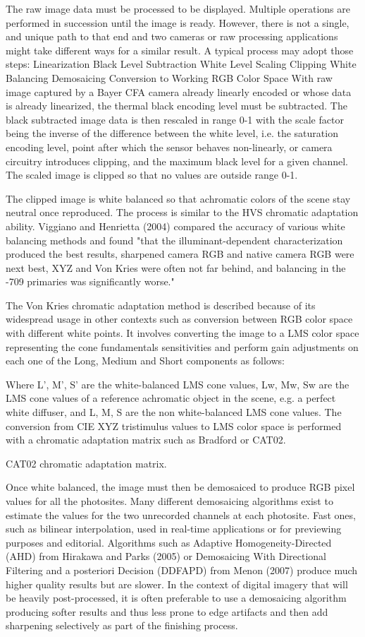 The raw image data must be processed to be displayed. Multiple operations are performed in succession until the image is ready. However, there is not a single, and unique path to that end and two cameras or raw processing applications might take different ways for a similar result. A typical process may adopt those steps:
Linearization
Black Level Subtraction
White Level Scaling
Clipping
White Balancing
Demosaicing
Conversion to Working RGB Color Space
With raw image captured by a Bayer CFA camera already linearly encoded or whose data is already linearized, the thermal black encoding level must be subtracted. The black subtracted image data is then rescaled in range 0-1 with the scale factor being the inverse of the difference between the white level, i.e. the saturation encoding level, point after which the sensor behaves non-linearly, or camera circuitry introduces clipping, and the maximum black level for a given channel. The scaled image is clipped so that no values are outside range 0-1.

The clipped image is white balanced so that achromatic colors of the scene stay neutral once reproduced. The process is similar to the HVS chromatic adaptation ability. Viggiano and Henrietta (2004) compared the accuracy of various white balancing methods and found "that the illuminant-dependent characterization produced the best results, sharpened camera RGB and native camera RGB were next best, XYZ and Von Kries were often not far behind, and balancing in the -709 primaries was significantly worse."

The Von Kries chromatic adaptation method is described because of its widespread usage in other contexts such as conversion between RGB color space with different white points. It involves converting the image to a LMS color space representing the cone fundamentals sensitivities and perform gain adjustments on each one of the Long, Medium and Short components as follows:

Where L', M', S' are the white-balanced LMS cone values, Lw, Mw, Sw are the LMS cone values of a reference achromatic object in the scene, e.g. a perfect white diffuser, and L, M, S are the non white-balanced LMS cone values. The conversion from CIE XYZ tristimulus values to LMS color space is performed with a chromatic adaptation matrix such as Bradford or CAT02.

CAT02 chromatic adaptation matrix.

Once white balanced, the image must then be demosaiced to produce RGB pixel values for all the photosites. Many different demosaicing algorithms exist to estimate the values for the two unrecorded channels at each photosite. Fast ones, such as bilinear interpolation, used in real-time applications or for previewing purposes and editorial. Algorithms such as Adaptive Homogeneity-Directed (AHD) from Hirakawa and Parks (2005) or Demosaicing With Directional Filtering and a posteriori Decision (DDFAPD) from Menon (2007) produce much higher quality results but are slower. In the context of digital imagery that will be heavily post-processed, it is often preferable to use a demosaicing algorithm producing softer results and thus less prone to edge artifacts and then add sharpening selectively as part of the finishing process.

